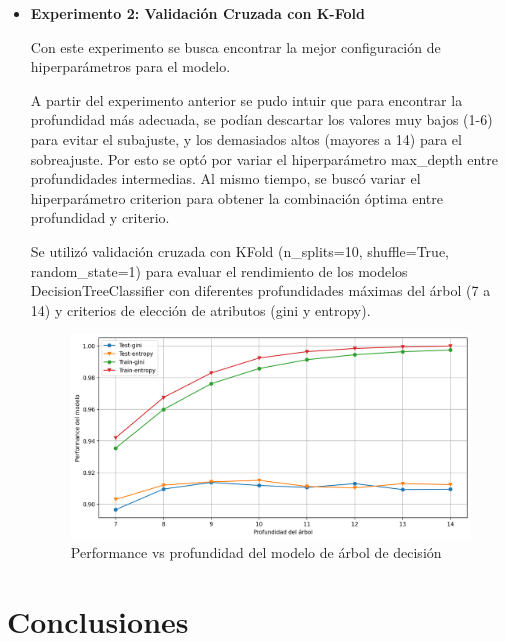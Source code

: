 \documentclass[11pt,a4paper, twocolumn]{article}
\begin{document}
\begin{itemize}
	\item[]
		\textbf{Experimento 2: Validación Cruzada con K-Fold }
 
Con este experimento se busca encontrar la mejor configuración de hiperparámetros para el modelo. 

A partir del experimento anterior se pudo intuir que para encontrar la profundidad más adecuada, se podían descartar los valores muy bajos (1-6) para evitar el subajuste, y los demasiados altos (mayores a 14) para el sobreajuste. Por esto se optó por variar el hiperparámetro max\_depth entre profundidades intermedias. 
Al mismo tiempo, se buscó variar el hiperparámetro criterion para obtener la combinación óptima entre profundidad y criterio. 

Se utilizó validación cruzada con KFold (n\_splits=10, shuffle=True, random\_state=1) para evaluar el rendimiento de los modelos DecisionTreeClassifier con diferentes profundidades máximas del árbol (7 a 14) y criterios de elección de atributos (gini y entropy). 

\begin{figure}[H]
	\centering
	\includegraphics[scale=0.6]{figuras/3c_entropy10.png}
	\caption{Performance vs profundidad del modelo de árbol de decisión}
	\label{fig:3c}
\end{figure}



\end{itemize}



\section{Conclusiones}
\end{document}
